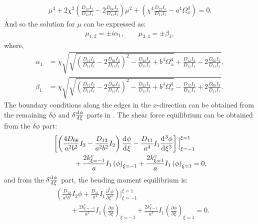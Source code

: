 \documentclass[preprint,12pt,number]{elsarticle}
\newcommand{\id}{\mathrm{d}\mkern1mu}
\begin{document}
%
\begin{equation}\label{eq:ODEx2}
\begin{split}
	\mu^4 + 2\chi^2\left(\frac{D_{12}I_2}{D_{11}I_1}-2\frac{D_{66}I_3}{D_{11}I_1}\right)\mu^2 + \left(\chi^4\frac{D_{22}I_4}{D_{11}I_1}-a^4\Omega_x^4\right) = 0.
\end{split}
\end{equation}
%
And so the solution for $\mu$ can be expressed as:
%
\begin{equation}\label{eq:mu}
\begin{split}
	\mu_{1,2} = \pm\textit{i} \alpha_1, \qquad \mu_{3,4} = \pm \beta_1,
\end{split}
\end{equation}
%
where,
%
\begin{subequations}\label{eq:alphax}
\begin{align}
	\alpha_1 &= \chi \sqrt{\sqrt{\left(\frac{D_{12}I_2}{D_{11}I_1}-2\frac{D_{66}I_3}{D_{11}I_1}\right)^2 - \frac{D_{22}I_4}{D_{11}I_1} + b^4\Omega_x^4} + \frac{D_{12}I_2}{D_{11}I_1} - 2\frac{D_{66}I_3}{D_{11}I_1}},\label{eq:alphax1}\\
	\beta_1 &= \chi \sqrt{\sqrt{\left(\frac{D_{12}I_2}{D_{11}I_1}-2\frac{D_{66}I_3}{D_{11}I_1}\right)^2 - \frac{D_{22}I_4}{D_{11}I_1} + b^4\Omega_x^4} - \frac{D_{12}I_2}{D_{11}I_1} + 2\frac{D_{66}I_3}{D_{11}I_1}}.\label{eq:alphax2}
\end{align}
\end{subequations}
%
The boundary conditions along the edges in the $x$-direction can be obtained from the remaining $\delta \phi$ and $\delta \frac{\id \phi}{\id \xi}$ parts in . 
The shear force equilibrium can be obtained from the $\delta \phi$ part:
%
\begin{equation}\label{eq:inertial_forcex}
\begin{split}
	&\left[ \left( \frac{4D_{66}}{a^2b^2} I_3 - \frac{D_{12}}{a^2b^2} I_2 \right) \frac{\id \phi}{\id \xi} 
	- \frac{D_{11}}{a^4} I_1 \frac{\id^3 \phi}{\id \xi^3} \right] \Big|^{\xi=1}_{\xi=-1}\\
	&\quad\qquad+ \frac{2k^v_{\xi=-1}}{a} I_1 \left(\phi\right)_{\xi=-1}
	+ \frac{2k^v_{\xi=1}}{a} I_1 \left(\phi\right)_{\xi=1} = 0,
\end{split}
\end{equation}
%
and from the $\delta \frac{\id \phi}{\id \xi}$ part, the bending moment equilibrium is:
%
\begin{equation}\label{eq:inertial_forcex2}
\begin{split}	
	&\left( \frac{D_{12}}{a^2b^2} I_2 \phi + \frac{D_{11}}{a^4} I_1 \frac{\partial^2 \phi}{\partial \xi^2} \right) 
	\Big|^{\xi=1}_{\xi=-1} \\
	&\qquad + \frac{2k^r_{\xi=-1}}{a^3} I_1 \left(\frac{\partial \phi}{\partial \xi}\right)_{\xi=-1}
	+ \frac{2k^r_{\xi=1}}{a^3} I_1 \left(\frac{\partial \phi}{\partial \xi}\right)_{\xi=1} = 0.
\end{split}
\end{equation}
\end{document}
